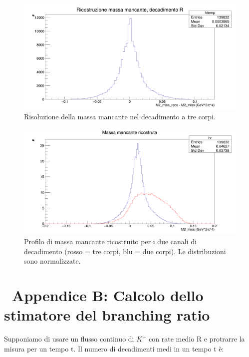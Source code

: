 \documentclass[8pt]{extarticle}
\begin{document}
\begin{figure}[!h]
\begin{center}
\includegraphics[scale=0.25]{reco_miss_R}
\caption{Risoluzione della massa mancante nel decadimento a tre corpi.}
\label{fig:reco_miss_R}
\end{center}
\end{figure}


\begin{figure}[!h]
\begin{center}
\includegraphics[scale=0.25]{reco_miss_norm}
\caption{Profilo di massa mancante ricostruito per i due canali di decadimento (rosso = tre corpi, blu = due corpi). Le distribuzioni
sono normalizzate.}
\label{fig:reco_miss_norm}
\end{center}
\end{figure}

\clearpage

\section{\ Appendice B: Calcolo dello stimatore del branching ratio} \label{sec:calcoli}
\justify

Supponiamo di usare un flusso continuo di $K^+$ con rate medio R e protrarre la misura per un tempo t. Il numero di decadimenti medi in un tempo t è: 
\end{document}
